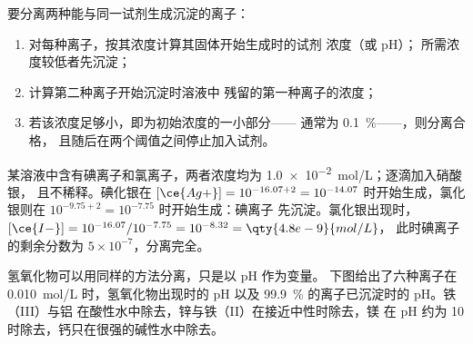 \begin{method}[选择性沉淀]\label{met:b1:precipitation:selective}
要分离两种能与同一试剂生成沉淀的离子：
\begin{enumerate}
  \item 对每种离子，按其浓度计算其固体开始生成时的试剂
        浓度（或 pH）；
        所需浓度较低者先沉淀；
  \item 计算第二种离子开始沉淀时溶液中
        残留的第一种离子的浓度；
  \item 若该浓度足够小，即为初始浓度的一小部分——
        通常为 \qty{0.1}{\percent}——，则分离合格，
        且随后在两个阈值之间停止加入试剂。
\end{enumerate}
\end{method}

\begin{example}[碘离子与氯离子]\label{ex:b1:precipitation:i-cl}
某溶液中含有碘离子和氯离子，两者浓度均为
\qty{1.0e-2}{mol/L}；逐滴加入硝酸银，
且不稀释。碘化银在 $[\ce{Ag+}] = 10^{-16.07 + 2} =
10^{-14.07}$ 时开始生成，氯化银则在 $10^{-9.75 + 2} = 10^{-7.75}$ 时开始生成：碘离子
先沉淀。氯化银出现时，
$[\ce{I-}] = 10^{-16.07}/10^{-7.75} = 10^{-8.32} = \qty{4.8e-9}{mol/L}$，
此时碘离子的剩余分数为 $5 \times 10^{-7}$，分离完全。
\end{example}

氢氧化物可以用同样的方法分离，只是以 pH 作为变量。
下图给出了六种离子在
\qty{0.010}{mol/L} 时，氢氧化物出现时的 pH 以及
\qty{99.9}{\percent} 的离子已沉淀时的 pH。铁（III）与铝
在酸性水中除去，锌与铁（II）在接近中性时除去，镁
在 pH 约为 10 时除去，钙只在很强的碱性水中除去。

